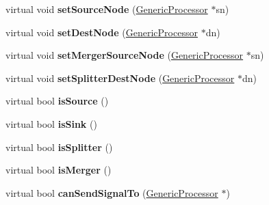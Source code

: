 \begin{DoxyCompactItemize}
\item 
\hypertarget{classGenericProcessor_a6a21d25d3ad79fb4867c732c64322d54}{virtual void {\bfseries set\-Source\-Node} (\hyperlink{classGenericProcessor}{Generic\-Processor} $\ast$sn)}\label{classGenericProcessor_a6a21d25d3ad79fb4867c732c64322d54}

\item 
\hypertarget{classGenericProcessor_af133f0046c23153f46cc5aa3b6980b93}{virtual void {\bfseries set\-Dest\-Node} (\hyperlink{classGenericProcessor}{Generic\-Processor} $\ast$dn)}\label{classGenericProcessor_af133f0046c23153f46cc5aa3b6980b93}

\item 
\hypertarget{classGenericProcessor_aba1548d2f5671b90d9c9bf716fafaeb4}{virtual void {\bfseries set\-Merger\-Source\-Node} (\hyperlink{classGenericProcessor}{Generic\-Processor} $\ast$sn)}\label{classGenericProcessor_aba1548d2f5671b90d9c9bf716fafaeb4}

\item 
\hypertarget{classGenericProcessor_ac553d8495ef07f5971a1f2abd0506b7e}{virtual void {\bfseries set\-Splitter\-Dest\-Node} (\hyperlink{classGenericProcessor}{Generic\-Processor} $\ast$dn)}\label{classGenericProcessor_ac553d8495ef07f5971a1f2abd0506b7e}

\item 
\hypertarget{classGenericProcessor_ab24b6dcb56efe4b66ced5bdddf2093de}{virtual bool {\bfseries is\-Source} ()}\label{classGenericProcessor_ab24b6dcb56efe4b66ced5bdddf2093de}

\item 
\hypertarget{classGenericProcessor_a38f377ecefaad8269198403205159bb3}{virtual bool {\bfseries is\-Sink} ()}\label{classGenericProcessor_a38f377ecefaad8269198403205159bb3}

\item 
\hypertarget{classGenericProcessor_a990ea34d9f34d482ef26e618f7990b36}{virtual bool {\bfseries is\-Splitter} ()}\label{classGenericProcessor_a990ea34d9f34d482ef26e618f7990b36}

\item 
\hypertarget{classGenericProcessor_ab0a0cdb5233b92d5552e9db6566d1445}{virtual bool {\bfseries is\-Merger} ()}\label{classGenericProcessor_ab0a0cdb5233b92d5552e9db6566d1445}

\item 
\hypertarget{classGenericProcessor_a3802e6cb4f8bd84840408bae0434bb8e}{virtual bool {\bfseries can\-Send\-Signal\-To} (\hyperlink{classGenericProcessor}{Generic\-Processor} $\ast$)}\label{classGenericProcessor_a3802e6cb4f8bd84840408bae0434bb8e}


\end{DoxyCompactItemize}
